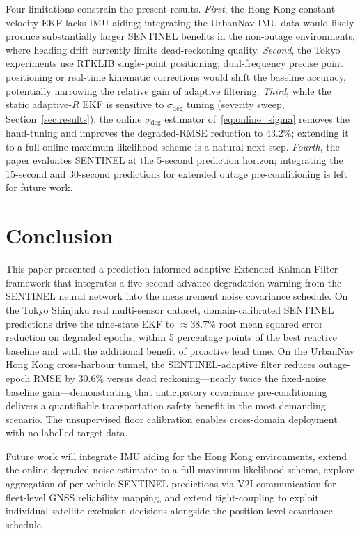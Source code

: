 \documentclass[journal]{IEEEtran}
\newcommand{\sigdeg}{\sigma_{\mathrm{deg}}}
\begin{document}
Four limitations constrain the present results.  \textit{First}, the Hong Kong
constant-velocity EKF lacks IMU aiding; integrating the UrbanNav IMU data
would likely produce substantially larger SENTINEL benefits in the non-outage
environments, where heading drift currently limits dead-reckoning quality.
\textit{Second}, the Tokyo experiments use RTKLIB single-point positioning;
dual-frequency precise point positioning or real-time kinematic corrections
would shift the baseline accuracy, potentially narrowing the relative gain
of adaptive filtering.  \textit{Third}, while the static
adaptive-$R$ EKF is sensitive to $\sigdeg$ tuning (severity sweep,
Section~\ref{sec:results}), the online $\sigdeg$ estimator
of~\eqref{eq:online_sigma} removes the hand-tuning and improves the degraded-RMSE
reduction to 43.2\%; extending it to a full online maximum-likelihood scheme
\cite{[AuthorYear_online_noise_estimation]} is a natural next step.  \textit{Fourth}, the paper evaluates SENTINEL
at the 5-second prediction horizon; integrating the 15-second and 30-second
predictions for extended outage pre-conditioning is left for future work.

\section{Conclusion}

This paper presented a prediction-informed adaptive Extended Kalman Filter
framework that integrates a five-second advance degradation warning from the
SENTINEL neural network into the measurement noise covariance schedule.
On the Tokyo Shinjuku real multi-sensor dataset, domain-calibrated SENTINEL
predictions drive the nine-state EKF to ${\approx}$38.7\% root mean squared
error reduction on degraded epochs, within 5 percentage points of the best
reactive baseline and with the additional benefit of proactive lead time.
On the UrbanNav Hong Kong cross-harbour tunnel, the SENTINEL-adaptive filter
reduces outage-epoch RMSE by 30.6\% versus dead reckoning---nearly twice
the fixed-noise baseline gain---demonstrating that anticipatory covariance
pre-conditioning delivers a quantifiable transportation safety benefit in the
most demanding scenario.  The unsupervised floor calibration enables
cross-domain deployment with no labelled target data.

Future work will integrate IMU aiding for the Hong Kong environments,
extend the online degraded-noise estimator to a full maximum-likelihood scheme,
explore aggregation of per-vehicle SENTINEL predictions via V2I communication
for fleet-level GNSS reliability mapping, and extend tight-coupling to
exploit individual satellite exclusion decisions alongside the position-level
covariance schedule.



\end{document}
